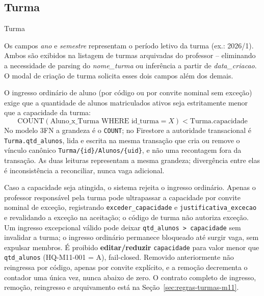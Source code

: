 \subsection{Turma}
\begin{entidade}{Turma}
\end{entidade}

\begin{explicacao}
Os campos \textit{ano} e \textit{semestre} representam o per\'{i}odo letivo da turma (ex.: 2026/1). Ambos s\~{a}o exibidos na listagem de turmas arquivadas do professor -- eliminando a necessidade de parsing do \textit{nome\_turma} ou infer\^{e}ncia a partir de \textit{data\_criacao}. O modal de cria\c{c}\~{a}o de turma solicita esses dois campos al\'{e}m dos demais.
\end{explicacao}

\begin{regra}
O ingresso ordinário de aluno (por código ou por convite nominal sem exceção)
exige que a quantidade de alunos matriculados ativos seja estritamente menor
que a capacidade da turma:
\[
\text{COUNT}(\text{Aluno\_x\_Turma WHERE id\_turma} = X) < \text{Turma.capacidade}
\]
No modelo 3FN a grandeza é o \texttt{COUNT}; no Firestore a autoridade
transacional é \texttt{Turma.qtd\_alunos}, lida e escrita na mesma transação que
cria ou remove o vínculo canônico
\texttt{Turma/\{id\}/Alunos/\{uid\}}, e não uma recontagem fora da transação.
As duas leituras representam a mesma grandeza; divergência entre elas é
inconsistência a reconciliar, nunca vaga adicional.

Caso a capacidade seja atingida, o sistema rejeita o ingresso ordinário. Apenas
o professor responsável pela turma pode ultrapassar a capacidade por convite
nominal de exceção, registrando \texttt{exceder\_capacidade} e
\texttt{justificativa\_excecao} e revalidando a exceção na aceitação; o código
de turma não autoriza exceção. Um ingresso excepcional válido pode deixar
\texttt{qtd\_alunos > capacidade} sem invalidar a turma; o ingresso ordinário
permanece bloqueado até surgir vaga, sem expulsar membros. É proibido
\textbf{editar/reduzir} \texttt{capacidade} para valor menor que
\texttt{qtd\_alunos} (HQ-M11-001 = A), fail-closed. Removido anteriormente não
reingressa por código, apenas por convite explícito, e a remoção decrementa o
contador uma única vez, nunca abaixo de zero. O contrato completo de ingresso,
remoção, reingresso e arquivamento está na Seção~\ref{sec:regras-turmas-m11}.
\end{regra}

